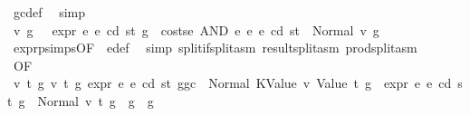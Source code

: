 \begin{isabellebody}
\ gc{\isacharunderscore}{\kern0pt}def\ \isamarkupfalse%
\ simp\isanewline
\ \ \ \ \ \ \isamarkupfalse%
\ \isamarkupfalse%
\ v\ g{\isacharprime}{\kern0pt}\ \ {\isacharasterisk}{\kern0pt}{\isacharasterisk}{\kern0pt}{\isacharasterisk}{\kern0pt}{\isacharcolon}{\kern0pt}\ {\isachardoublequoteopen}expr\ e{}\ e\ cd\ st\ {\isacharparenleft}{\kern0pt}g\ {\isacharminus}{\kern0pt}\ costs\isactrlsub e\ {\isacharparenleft}{\kern0pt}AND\ e{}\ e{}{\isacharparenright}{\kern0pt}\ e\ cd\ st{\isacharparenright}{\kern0pt}\ {\isacharequal}{\kern0pt}\ Normal\ {\isacharparenleft}{\kern0pt}v{\isacharcomma}{\kern0pt}\ g{\isacharprime}{\kern0pt}{\isacharparenright}{\kern0pt}{\isachardoublequoteclose}\ \isamarkupfalse%
\ expr{\isachardot}{\kern0pt}psimps{\isacharparenleft}{\kern0pt}{}{}{\isacharparenright}{\kern0pt}{\isacharbrackleft}{\kern0pt}OF\ {}{}{\isacharparenleft}{\kern0pt}{}{\isacharparenright}{\kern0pt}{\isacharbrackright}{\kern0pt}\ e{\isacharunderscore}{\kern0pt}def\ \isamarkupfalse%
\ {\isacharparenleft}{\kern0pt}simp\ split{\isacharcolon}{\kern0pt}if{\isacharunderscore}{\kern0pt}split{\isacharunderscore}{\kern0pt}asm\ result{\isachardot}{\kern0pt}split{\isacharunderscore}{\kern0pt}asm\ prod{\isachardot}{\kern0pt}split{\isacharunderscore}{\kern0pt}asm{\isacharparenright}{\kern0pt}\isanewline
\ \ \ \ \ \ \isamarkupfalse%
\ {}{}{\isacharparenleft}{\kern0pt}{}{\isacharparenright}{\kern0pt}{\isacharbrackleft}{\kern0pt}OF\ {\isacharasterisk}{\kern0pt}\ {\isacharasterisk}{\kern0pt}{\isacharasterisk}{\kern0pt}\ {\isacharasterisk}{\kern0pt}{\isacharasterisk}{\kern0pt}{\isacharasterisk}{\kern0pt}{\isacharbrackright}{\kern0pt}\ \isamarkupfalse%
\ {\isachardoublequoteopen}{\isasymAnd}v\ t\ g{\isacharprime}{\kern0pt}\ v{\isacharprime}{\kern0pt}\ t{\isacharprime}{\kern0pt}\ g{\isacharprime}{\kern0pt}{\isacharprime}{\kern0pt}{\isachardot}{\kern0pt}\ expr\ e{}\ e\ cd\ st\ {\isacharparenleft}{\kern0pt}g{\isacharminus}{\kern0pt}gc{\isacharparenright}{\kern0pt}\ {\isacharequal}{\kern0pt}\ Normal\ {\isacharparenleft}{\kern0pt}{\isacharparenleft}{\kern0pt}KValue\ v{\isacharcomma}{\kern0pt}\ Value\ t{\isacharparenright}{\kern0pt}{\isacharcomma}{\kern0pt}\ g{\isacharprime}{\kern0pt}{\isacharparenright}{\kern0pt}\ {\isasymLongrightarrow}\ expr\ e{}\ e\ cd\ st\ g{\isacharprime}{\kern0pt}\ {\isacharequal}{\kern0pt}\ Normal\ {\isacharparenleft}{\kern0pt}{\isacharparenleft}{\kern0pt}v{\isacharprime}{\kern0pt}{\isacharcomma}{\kern0pt}\ t{\isacharprime}{\kern0pt}{\isacharparenright}{\kern0pt}{\isacharcomma}{\kern0pt}\ g{\isacharprime}{\kern0pt}{\isacharprime}{\kern0pt}{\isacharparenright}{\kern0pt}\ {\isasymLongrightarrow}\ g{\isacharprime}{\kern0pt}{\isacharprime}{\kern0pt}\ {\isasymle}\ g{\isacharprime}{\kern0pt}{\isachardoublequoteclose}\ \isamarkupfalse%

\end{isabellebody}
